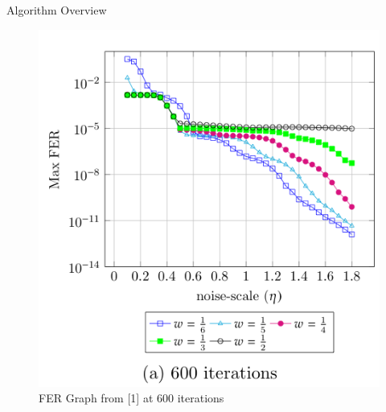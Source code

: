 \documentclass[10pt,ignorenonframetext,]{beamer}
\begin{document}
\begin{frame}{Algorithm Overview}
\begin{figure}
\centering
\includegraphics{figures/thumbnail_Ngdbf-error-floor.cgi.png}
\caption{FER Graph from {[}1{]} at 600 iterations}
\end{figure}
\end{frame}
\end{document}
